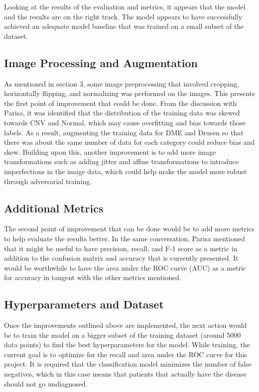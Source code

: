 \documentclass[11pt]{article}
\begin{document}
Looking at the results of the evaluation and metrics, it appears that the model and the results are on the right track. The model appears to have successfully achieved an adequate model baseline that was trained on a small subset of the dataset.

\subsection{Image Processing and Augmentation}

As mentioned in section 3, some image preprocessing that involved cropping, horizontally flipping, and normalizing was performed on the images. This presents the first point of improvement that could be done. From the discussion with Parisa, it was identified that the distribution of the training data was skewed towards CNV and Normal, which may cause overfitting and bias towards those labels. As a result, augmenting the training data for DME and Drusen so that there was about the same number of data for each category could reduce bias and skew. Building upon this, another improvement is to add more image transformations such as adding jitter and affine transformations to introduce imperfections in the image data, which could help make the model more robust through adversarial training.

\subsection{Additional Metrics}

The second point of improvement that can be done would be to add more metrics to help evaluate the results better. In the same conversation, Parisa mentioned that it might be useful to have precision, recall, and F-1 score as a metric in addition to the confusion matrix and accuracy that is currently presented. It would be worthwhile to have the area under the ROC curve (AUC) as a metric for accuracy in tangent with the other metrics mentioned.

\subsection{Hyperparameters and Dataset}

Once the improvements outlined above are implemented, the next action would be to train the model on a bigger subset of the training dataset (around 5000 data points) to find the best hyperparameters for the model. While training, the current goal is to optimize for the recall and area under the ROC curve for this project. It is required that the classification model minimizes the number of false negatives, which in this case means that patients that actually have the disease should not go undiagnosed.
\end{document}

